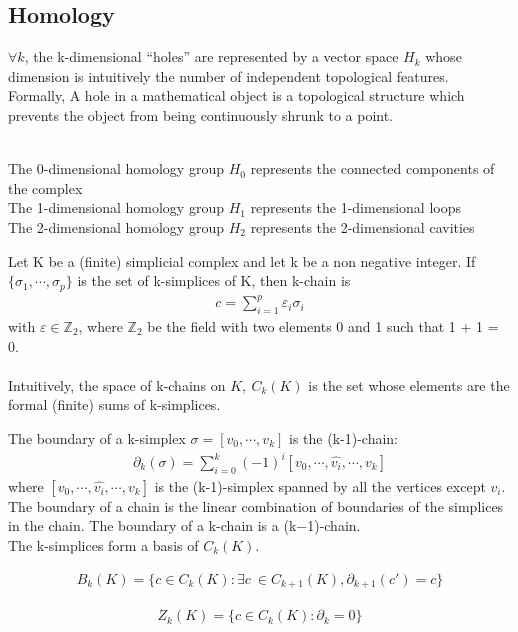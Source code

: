\subsection{\textbf{Homology}}
\begin{definition}
$\forall k$, the k-dimensional “holes” are represented by a vector space $H_k$ whose dimension is intuitively the number of independent topological features.\\
Formally, A hole in a mathematical object is a topological structure which prevents the object from being continuously shrunk to a point.
\end{definition}
\begin{example}
\ \\
The 0-dimensional homology group $H_0$ represents the connected components of the complex\\
The 1-dimensional homology group $H_1$ represents the 1-dimensional loops\\
The 2-dimensional homology group $H_2$ represents the 2-dimensional cavities
\end{example}
\begin{definition}
Let K be a (finite) simplicial complex and let k be a non negative integer. If $\{\sigma_1,\cdots,\sigma_p\}$ is the set of k-simplices of K, then k-chain is
\begin{align*}
    c = \sum_{i=1}^p \varepsilon_i\sigma_i
\end{align*}
with $\varepsilon \in \mathbb{Z}_2$, where $\mathbb{Z}_2$ be the field with two elements 0 and 1 such that 1 + 1 = 0.\\
\\
Intuitively, the space of k-chains on $K,\ C_k(K)$ is the set whose elements are the formal (finite) sums of k-simplices.
\end{definition}
The boundary of a k-simplex $\sigma =[v_0,\cdots,v_k]$ is the (k-1)-chain:
\begin{align*}
    \partial_k(\sigma) = \sum_{i=0}^k(-1)^i[v_0,\cdots,\hat{v_i},\cdots,v_k]
\end{align*}
where $[v_0,\cdots,\hat{v_i},\cdots,v_k]$ is the (k-1)-simplex spanned by all the vertices except $v_i$.
\\
The boundary of a chain is the linear combination of boundaries of the simplices in the chain. The boundary of a k-chain is a (k−1)-chain.\\

The k-simplices form a basis of $C_k(K)$.
\begin{definition} 
\begin{align*}
    B_k(K) = \{c \in C_k(K) : \exists c\ \in C_{k+1}(K), \partial_{k+1}(c') = c\}
\end{align*}
\end{definition}
\begin{definition} 
\begin{align*}
    Z_k(K) = \{c \in C_k(K) : \partial_{k}=0\}
\end{align*}
\end{definition}

